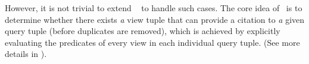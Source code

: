 \begin{example}
{However, it is not trivial to extend \rba\ %
to handle such cases. %
The core idea of \rba\ is to determine whether there exists \textit{a} view tuple that can provide a citation to \textit{a} given query tuple (before duplicates are removed), which is achieved by explicitly evaluating the predicates of every view in each individual query tuple.  (See more details in \cite{wu2018data}).}
\end{example}